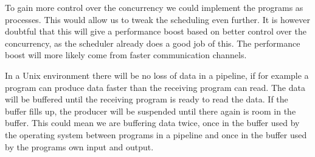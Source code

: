 To gain more control over the concurrency we could implement the
programs as processes. This would allow us to tweak the scheduling
even further. It is however doubtful that this will give a performance
boost based on better control over the concurrency, as the scheduler
already does a good job of this. The performance boost will more
likely come from faster communication channels. 

In a Unix environment there will be no loss of data in a pipeline,
if for example a program can produce data faster than the receiving
program can read. The data will be buffered until the receiving
program is ready to read the data. If the buffer fills up, the
producer will be suspended until there again is room in the
buffer. This could mean we are buffering data twice, once in the
buffer used by the operating system between programs in a pipeline and
once in the buffer used by the programs own input and output.
